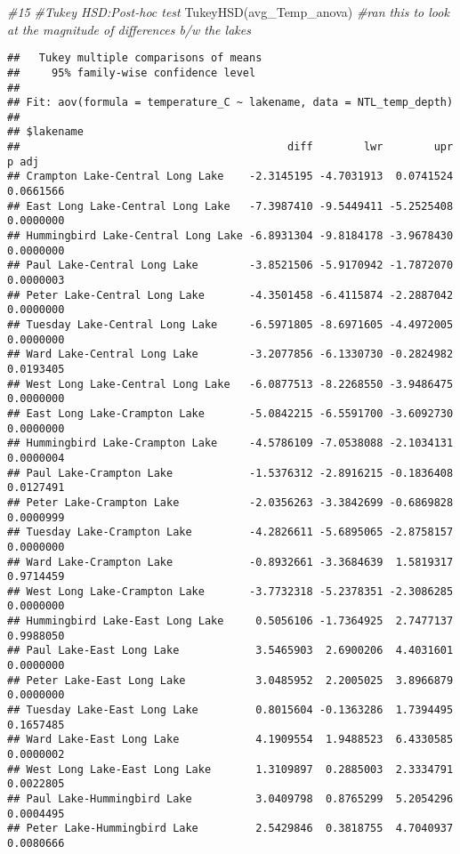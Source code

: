 \documentclass[
]{article}
\newenvironment{Shaded}{\begin{snugshade}}{\end{snugshade}}
\newcommand{\CommentTok}[1]{\textcolor[rgb]{0.56,0.35,0.01}{\textit{#1}}}
\newcommand{\FunctionTok}[1]{\textcolor[rgb]{0.00,0.00,0.00}{#1}}
\newcommand{\NormalTok}[1]{#1}
\begin{document}
\begin{Shaded}
\begin{Highlighting}[]
\CommentTok{\#15}
\CommentTok{\#Tukey HSD:Post{-}hoc test }
\FunctionTok{TukeyHSD}\NormalTok{(avg\_Temp\_anova) }\CommentTok{\#ran this to look at the magnitude of differences b/w the lakes}
\end{Highlighting}
\end{Shaded}

\begin{verbatim}
##   Tukey multiple comparisons of means
##     95% family-wise confidence level
## 
## Fit: aov(formula = temperature_C ~ lakename, data = NTL_temp_depth)
## 
## $lakename
##                                          diff        lwr        upr     p adj
## Crampton Lake-Central Long Lake    -2.3145195 -4.7031913  0.0741524 0.0661566
## East Long Lake-Central Long Lake   -7.3987410 -9.5449411 -5.2525408 0.0000000
## Hummingbird Lake-Central Long Lake -6.8931304 -9.8184178 -3.9678430 0.0000000
## Paul Lake-Central Long Lake        -3.8521506 -5.9170942 -1.7872070 0.0000003
## Peter Lake-Central Long Lake       -4.3501458 -6.4115874 -2.2887042 0.0000000
## Tuesday Lake-Central Long Lake     -6.5971805 -8.6971605 -4.4972005 0.0000000
## Ward Lake-Central Long Lake        -3.2077856 -6.1330730 -0.2824982 0.0193405
## West Long Lake-Central Long Lake   -6.0877513 -8.2268550 -3.9486475 0.0000000
## East Long Lake-Crampton Lake       -5.0842215 -6.5591700 -3.6092730 0.0000000
## Hummingbird Lake-Crampton Lake     -4.5786109 -7.0538088 -2.1034131 0.0000004
## Paul Lake-Crampton Lake            -1.5376312 -2.8916215 -0.1836408 0.0127491
## Peter Lake-Crampton Lake           -2.0356263 -3.3842699 -0.6869828 0.0000999
## Tuesday Lake-Crampton Lake         -4.2826611 -5.6895065 -2.8758157 0.0000000
## Ward Lake-Crampton Lake            -0.8932661 -3.3684639  1.5819317 0.9714459
## West Long Lake-Crampton Lake       -3.7732318 -5.2378351 -2.3086285 0.0000000
## Hummingbird Lake-East Long Lake     0.5056106 -1.7364925  2.7477137 0.9988050
## Paul Lake-East Long Lake            3.5465903  2.6900206  4.4031601 0.0000000
## Peter Lake-East Long Lake           3.0485952  2.2005025  3.8966879 0.0000000
## Tuesday Lake-East Long Lake         0.8015604 -0.1363286  1.7394495 0.1657485
## Ward Lake-East Long Lake            4.1909554  1.9488523  6.4330585 0.0000002
## West Long Lake-East Long Lake       1.3109897  0.2885003  2.3334791 0.0022805
## Paul Lake-Hummingbird Lake          3.0409798  0.8765299  5.2054296 0.0004495
## Peter Lake-Hummingbird Lake         2.5429846  0.3818755  4.7040937 0.0080666

\end{verbatim}
\end{document}
